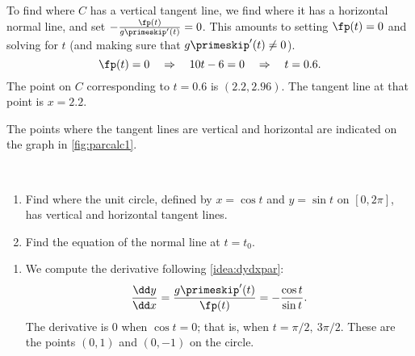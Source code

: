 \begin{example}
\begin{enumerate}
	To find where $C$ has a vertical tangent line, we find where it has a horizontal normal line, and set $-\frac{\fp(t)}{g\primeskip'(t)}=0$. This amounts to setting $\fp(t)=0$ and solving for $t$ (and making sure that $g\primeskip'(t)\neq 0$). 
	\[\fp(t)=0 \quad \Rightarrow \quad 10t-6=0 \quad \Rightarrow \quad t=0.6.\]
	The point on $C$ corresponding to $t=0.6$ is $(2.2,2.96)$. The tangent line at that point is $x=2.2$.
	
	The points where the tangent lines are vertical and horizontal are indicated on the graph in \autoref{fig:parcalc1}.
\end{enumerate}
\end{example}

\begin{example}\label{ex_parcalc2}
\mbox{}\\[-2\baselineskip]\parbox[t]{\linewidth}{\begin{enumerate}
	\item	Find where the unit circle, defined by $x=\cos t$ and $y=\sin t$ on $[0,2\pi]$, has vertical and horizontal tangent lines. 
	\item	 Find the equation of the normal line at $t=t_0$.
\end{enumerate}}\vspace{0pt}
\solution
\begin{enumerate}
	\item We compute the derivative following \autoref{idea:dydxpar}:
	\[\frac{\dd y}{\dd x} = \frac{g\primeskip'(t)}{\fp(t)} = -\frac{\cos t}{\sin t}.\]
	The derivative is $0$ when $\cos t= 0$; that is, when $t=\pi/2,\ 3\pi/2$. These are the points $(0,1)$ and $(0,-1)$ on the circle.


\end{enumerate}
\end{example}
